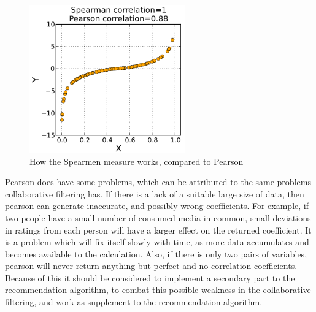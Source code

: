 \begin{figure}[htb]
\centering
\includegraphics[width=0.6\textwidth]{Images/spearman.png}
\caption{How the Spearmen measure works, compared to Pearson}
\label{Spearman}
\end{figure}

Pearson does have some problems, which can be attributed to the same problems collaborative filtering has. If there is a lack of a suitable large size of data, then pearson can generate inaccurate, and possibly wrong coefficients. For example, if two people have a small number of consumed media in common, small deviations in ratings from each person will have a larger effect on the returned coefficient. It is a problem which will fix itself slowly with time, as more data accumulates and becomes available to the calculation. Also, if there is only two pairs of variables, pearson will never return anything but perfect and no correlation coefficients. Because of this it should be considered to implement a secondary part to the recommendation algorithm, to combat this possible weakness in the collaborative filtering, and work as supplement to the recommendation algorithm.
